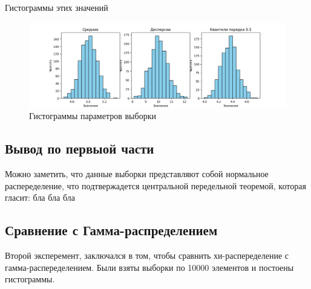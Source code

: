 \documentclass{article}
\begin{document}
Гистограммы этих значений
\begin{figure}
      \centering
      \includegraphics[width=0.8\linewidth]{Python/first-exp.png}
      \caption{Гистограммы параметров выборки}
\end{figure}

\subsection{Вывод по первыой части}
Можно заметить, что данные выборки представляют собой нормальное распеределение, что подтвержадется центральной передельной теоремой, которая гласит: бла бла бла


\subsection{Сравнение с Гамма-распределением}
Второй эксперемент, заключался в том, чтобы сравнить хи-распеределение с гамма-распеределением.
Были взяты выборки по 10000 элементов и постоены гистограммы.
\end{document}
